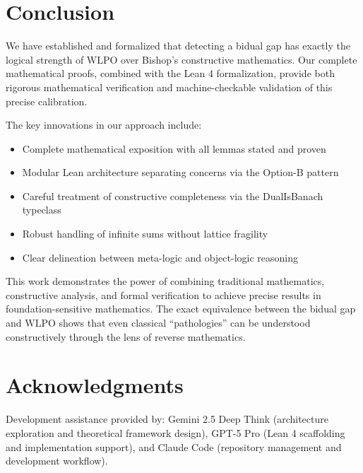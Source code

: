 \documentclass[11pt]{article}  %
\newcommand{\WLPO}{\mathrm{WLPO}}
\begin{document}
\section{Conclusion}

We have established and formalized that detecting a bidual gap has exactly the logical strength of $\WLPO$ over Bishop's constructive mathematics. Our complete mathematical proofs, combined with the Lean 4 formalization, provide both rigorous mathematical verification and machine-checkable validation of this precise calibration.

The key innovations in our approach include:
\begin{itemize}
\item Complete mathematical exposition with all lemmas stated and proven
\item Modular Lean architecture separating concerns via the Option-B pattern
\item Careful treatment of constructive completeness via the DualIsBanach typeclass
\item Robust handling of infinite sums without lattice fragility
\item Clear delineation between meta-logic and object-logic reasoning
\end{itemize}

This work demonstrates the power of combining traditional mathematics, constructive analysis, and formal verification to achieve precise results in foundation-sensitive mathematics. The exact equivalence between the bidual gap and $\WLPO$ shows that even classical ``pathologies'' can be understood constructively through the lens of reverse mathematics.

\section*{Acknowledgments}
Development assistance provided by: Gemini 2.5 Deep Think (architecture exploration and theoretical framework design), GPT-5 Pro (Lean 4 scaffolding and implementation support), and Claude Code (repository management and development workflow).
\end{document}
